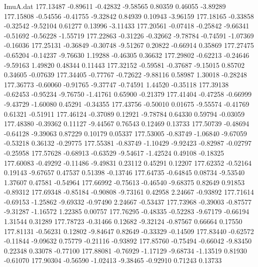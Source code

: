 \begin{filecontents}{ImuA.dat}
 177.13487   -0.89611   -0.42832   -9.58565    0.80359    0.46055   -3.89289
 177.15808   -0.54556   -0.41755   -9.32842    0.84939    0.10943   -3.96159
 177.18165   -0.33858   -0.32542   -9.52104    0.61277    0.13996   -3.11433
 177.20561   -0.07418   -0.25842   -9.66341   -0.51692   -0.56228   -1.55719
 177.22863   -0.31226   -0.32662   -9.78784   -0.74591   -1.07369   -0.16036
 177.25131   -0.36849   -0.30748   -9.51267    0.20822   -0.66914    0.35869
 177.27475   -0.65204   -0.14237   -9.76630    1.19288   -0.46305    0.36632
 177.29802   -0.62213   -0.24646   -9.59163    1.49820    0.48344    0.11443
 177.32152   -0.59581   -0.37687   -9.15015    0.85702    0.34605   -0.07639
 177.34405   -0.77767   -0.72622   -9.88116    0.58987    1.30018   -0.28248
 177.36773   -0.60060   -0.91765   -9.37747   -0.74591    1.44520   -0.35118
 177.39138   -0.62453   -0.95234   -9.76750   -1.41761    0.65900   -0.21379
 177.41404   -0.47258   -0.66999   -9.43729   -1.60080    0.45291   -0.34355
 177.43756   -0.50010    0.01675   -9.55574   -0.41769    0.61321   -0.51911
 177.46124   -0.37089    0.12921   -9.78784    0.64330    0.59794   -0.03059
 177.48380   -0.39362    0.11127   -9.44567    0.76543    0.12469    0.13733
 177.50739   -0.48694   -0.64128   -9.39063    0.87229    0.10179    0.05337
 177.53005   -0.83749   -1.06840   -9.67059   -0.53218    0.36132   -0.29775
 177.55381   -0.83749   -1.10429   -9.92423   -0.82987   -0.02797   -0.25958
 177.57628   -0.68913   -0.63529   -9.54617   -1.42524    0.49108   -0.18325
 177.60083   -0.49292   -0.11486   -9.49831    0.23112    0.45291    0.12207
 177.62352   -0.52164    0.19143   -9.67657    0.47537    0.51398   -0.13746
 177.64735   -0.64845    0.08734   -9.53540    1.37607    0.47581   -0.54964
 177.66992   -0.75613   -0.46540   -9.68375    0.82649    0.91853   -0.89312
 177.69348   -0.85184   -0.90808   -9.73161    0.42958    2.24667   -0.93892
 177.71614   -0.69153   -1.25862   -9.69332   -0.97490    2.24667   -0.53437
 177.73968   -0.39003   -0.87577   -9.31287   -1.16572    1.22385    0.00757
 177.76295   -0.48335   -0.52283   -9.67179   -0.66194    1.31544    0.31289
 177.78723   -0.31466    0.12682   -9.32124   -0.87567    0.66664    0.17550
 177.81131   -0.56231    0.12802   -9.84647    0.82649   -0.33329   -0.14509
 177.83440   -0.62572   -0.11844   -9.09632    0.75779   -0.21116   -0.93892
 177.85760   -0.75494   -0.66042   -9.83450    0.22348    0.33078   -0.77100
 177.88081   -0.76929   -1.17129   -9.68734   -1.13519    0.81930   -0.61070
 177.90304   -0.56590   -1.02413   -9.38465   -0.92910    0.71243    0.13733

\end{filecontents}
